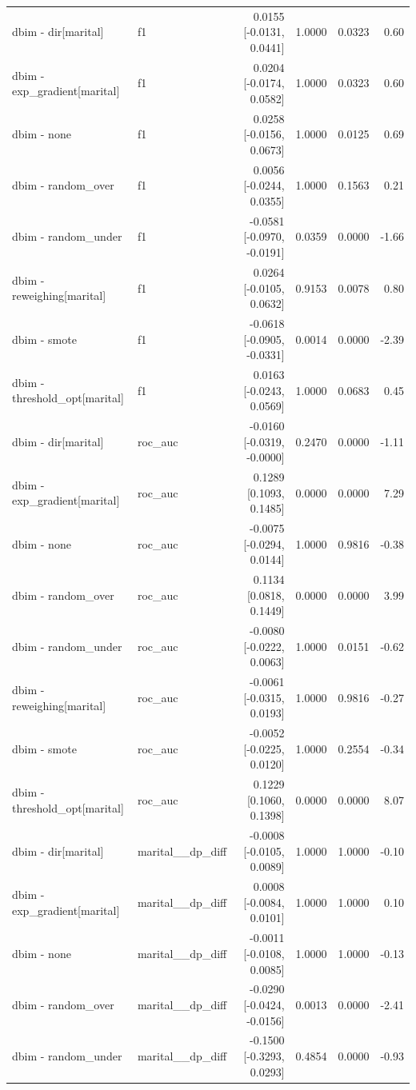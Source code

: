 \begin{table}[t]
{\begin{tabular}{llrrrr}
dbim - dir[marital] & f1 & 0.0155 [-0.0131, 0.0441] & 1.0000 & 0.0323 & 0.60 \\
dbim - exp\_gradient[marital] & f1 & 0.0204 [-0.0174, 0.0582] & 1.0000 & 0.0323 & 0.60 \\
dbim - none & f1 & 0.0258 [-0.0156, 0.0673] & 1.0000 & 0.0125 & 0.69 \\
dbim - random\_over & f1 & 0.0056 [-0.0244, 0.0355] & 1.0000 & 0.1563 & 0.21 \\
dbim - random\_under & f1 & -0.0581 [-0.0970, -0.0191] & 0.0359 & 0.0000 & -1.66 \\
dbim - reweighing[marital] & f1 & 0.0264 [-0.0105, 0.0632] & 0.9153 & 0.0078 & 0.80 \\
dbim - smote & f1 & -0.0618 [-0.0905, -0.0331] & 0.0014 & 0.0000 & -2.39 \\
dbim - threshold\_opt[marital] & f1 & 0.0163 [-0.0243, 0.0569] & 1.0000 & 0.0683 & 0.45 \\
dbim - dir[marital] & roc\_auc & -0.0160 [-0.0319, -0.0000] & 0.2470 & 0.0000 & -1.11 \\
dbim - exp\_gradient[marital] & roc\_auc & 0.1289 [0.1093, 0.1485] & 0.0000 & 0.0000 & 7.29 \\
dbim - none & roc\_auc & -0.0075 [-0.0294, 0.0144] & 1.0000 & 0.9816 & -0.38 \\
dbim - random\_over & roc\_auc & 0.1134 [0.0818, 0.1449] & 0.0000 & 0.0000 & 3.99 \\
dbim - random\_under & roc\_auc & -0.0080 [-0.0222, 0.0063] & 1.0000 & 0.0151 & -0.62 \\
dbim - reweighing[marital] & roc\_auc & -0.0061 [-0.0315, 0.0193] & 1.0000 & 0.9816 & -0.27 \\
dbim - smote & roc\_auc & -0.0052 [-0.0225, 0.0120] & 1.0000 & 0.2554 & -0.34 \\
dbim - threshold\_opt[marital] & roc\_auc & 0.1229 [0.1060, 0.1398] & 0.0000 & 0.0000 & 8.07 \\
dbim - dir[marital] & marital\_\_dp\_diff & -0.0008 [-0.0105, 0.0089] & 1.0000 & 1.0000 & -0.10 \\
dbim - exp\_gradient[marital] & marital\_\_dp\_diff & 0.0008 [-0.0084, 0.0101] & 1.0000 & 1.0000 & 0.10 \\
dbim - none & marital\_\_dp\_diff & -0.0011 [-0.0108, 0.0085] & 1.0000 & 1.0000 & -0.13 \\
dbim - random\_over & marital\_\_dp\_diff & -0.0290 [-0.0424, -0.0156] & 0.0013 & 0.0000 & -2.41 \\
dbim - random\_under & marital\_\_dp\_diff & -0.1500 [-0.3293, 0.0293] & 0.4854 & 0.0000 & -0.93 \\

\end{tabular}}
\end{table}
